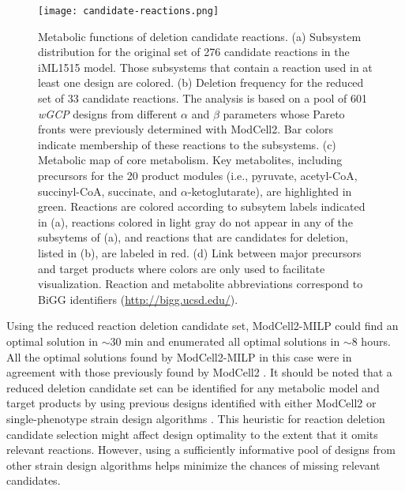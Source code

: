 \begin{figure}[p]
    \caption[Metabolic functions of deletion candidate reactions]{Metabolic functions of deletion candidate reactions. (a) Subsystem distribution for the original set of 276 candidate reactions in the iML1515 model. Those subsystems that contain a reaction used in at least one design are colored.  (b) Deletion frequency for the reduced set of 33 candidate reactions. The analysis is based on a pool of 601 \textit{wGCP} designs from different $\alpha$ and $\beta$ parameters whose Pareto fronts were previously determined with ModCell2.\citep{garcia2019} Bar colors indicate membership of these reactions to the subsystems. (c) Metabolic map of core metabolism. Key metabolites, including precursors for the 20 product modules (i.e., pyruvate, acetyl-CoA, succinyl-CoA, succinate, and $\alpha$-ketoglutarate), are highlighted in green. Reactions are colored according to subsytem labels indicated in (a), reactions colored in light gray do not appear  in any of the subsytems of (a), and reactions that are candidates for deletion, listed in (b), are labeled in red. (d) Link between major precursors and target products where colors are only used to facilitate visualization. Reaction and metabolite abbreviations correspond to BiGG\citep{king2015} identifiers (\protect\url{http://bigg.ucsd.edu/}).
    }
    \centering
    \texttt{[image: candidate-reactions.png]}
    \label{fig5:candidate-reactions}
\end{figure}

Using the reduced reaction deletion candidate set, ModCell2-MILP could find an optimal solution in $\sim 30$ min and enumerated all optimal solutions in $\sim 8$ hours. All the optimal solutions found by ModCell2-MILP in this case were in agreement with those previously found by ModCell2 \citep{garcia2019}. It should be noted that a reduced deletion candidate set can be identified for any metabolic model and target products by using previous designs identified with either ModCell2 or single-phenotype strain design algorithms \citep{long2015}. This heuristic for reaction deletion candidate selection might affect design optimality to the extent that it omits relevant reactions. However, using a sufficiently informative pool of designs from other strain design algorithms helps minimize the chances of missing relevant candidates.


